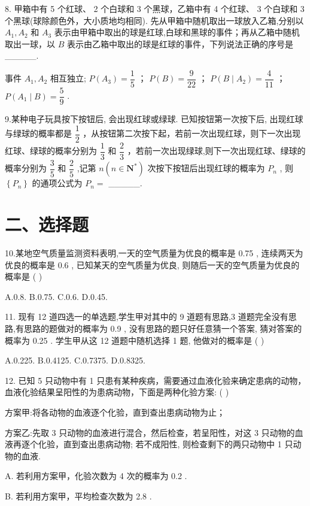 8. 甲箱中有 5 个红球、 2 个白球和 3 个黑球，乙箱中有 4 个红球、 3 个白球和 3 个黑球(球除颜色外，大小质地均相同). 先从甲箱中随机取出一球放入乙箱,分别以 ${A}_{1},{A}_{2}$ 和 ${A}_{3}$ 表示由甲箱中取出的球是红球,白球和黑球的事件；再从乙箱中随机取出一球，以 $B$ 表示由乙箱中取出的球是红球的事件，下列说法正确的序号是\_\_\_\_\_.

  事件 ${A}_{1},{A}_{2}$ 相互独立;    $P\left( {A}_{3}\right)  = \dfrac{1}{5}$ ；   $P\left( B\right)  = \dfrac{9}{22}$ ；   $P\left( {B \mid  {A}_{2}}\right)  = \dfrac{4}{11}$ ；   $P\left( {{A}_{1} \mid  B}\right)  = \dfrac{5}{9}$ .

9.某种电子玩具按下按钮后, 会出现红球或绿球. 已知按钮第一次按下后, 出现红球与绿球的概率都是 $\dfrac{1}{2}$ ，从按钮第二次按下起，若前一次出现红球，则下一次出现红球、绿球的概率分别为 $\dfrac{1}{3}$ 和 $\dfrac{2}{3}$ ，若前一次出现绿球,则下一次出现红球、绿球的概率分别为 $\dfrac{3}{5}$ 和 $\dfrac{2}{5}$ ,记第 $n\left( {n \in  {\mathbf{N}}^{ * }}\right)$ 次按下按钮后出现红球的概率为 ${P}_{n}$ , 则 $\left\{  {P}_{n}\right\}$ 的通项公式为 ${P}_{n} =$ \_\_\_\_\_.

\section*{二、选择题}

10.某地空气质量监测资料表明,一天的空气质量为优良的概率是 0.75 , 连续两天为优良的概率是 0.6 , 已知某天的空气质量为优良, 则随后一天的空气质量为优良的概率是 ( )

A.0.8. B.0.75. C.0.6. D.0.45.

11. 现有 12 道四选一的单选题,学生甲对其中的 9 道题有思路,3 道题完全没有思路,有思路的题做对的概率为 0.9 , 没有思路的题只好任意猜一个答案, 猜对答案的概率为 0.25 . 学生甲从这 12 道题中随机选择 1 题, 他做对的概率是 ( )

A.0.225. B.0.4125. C.0.7375. D.0.8325.

12. 已知 5 只动物中有 1 只患有某种疾病，需要通过血液化验来确定患病的动物，血液化验结果呈阳性的为患病动物，下面是两种化验方案: ( )

方案甲:将各动物的血液逐个化验，直到查出患病动物为止；

方案乙:先取 3 只动物的血液进行混合，然后检查，若呈阳性，对这 3 只动物的血液再逐个化验，直到查出患病动物; 若不成阳性, 则检查剩下的两只动物中 1 只动物的血液.

A. 若利用方案甲，化验次数为 4 次的概率为 0.2 .

B. 若利用方案甲，平均检查次数为 2.8 .


